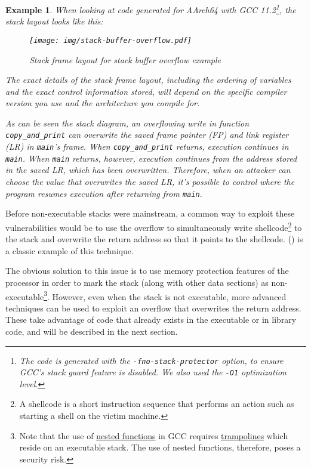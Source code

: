 \documentclass[
  a4paper,
]{report}
\newtheorem{example}{Example}
\begin{document}
\begin{example}
When looking at code generated for AArch64 with GCC 11.2\footnote{The
  code is generated with the \texttt{-fno-stack-protector} option, to
  ensure GCC's stack guard feature is disabled. We also used the
  \texttt{-O1} optimization level.}, the stack layout looks like this:

\begin{figure}
\centering
\texttt{[image: img/stack-buffer-overflow.pdf]}
\caption{Stack frame layout for stack buffer overflow example}
\end{figure}

The exact details of the stack frame layout, including the ordering of
variables and the exact control information stored, will depend on the
specific compiler version you use and the architecture you compile for.

As can be seen the stack diagram, an overflowing write in function
\texttt{copy\_and\_print} can overwrite the saved frame pointer (FP) and
link register (LR) in \texttt{main}'s frame. When
\texttt{copy\_and\_print} returns, execution continues in \texttt{main}.
When \texttt{main} returns, however, execution continues from the
address stored in the saved LR, which has been overwritten. Therefore,
when an attacker can choose the value that overwrites the saved LR, it's
possible to control where the program resumes execution after returning
from \texttt{main}.

\end{example}

Before non-executable stacks were mainstream, a common way to exploit
these vulnerabilities would be to use the overflow to simultaneously
write shellcode\footnote{A shellcode is a short instruction sequence
  that performs an action such as starting a shell on the victim
  machine.} to the stack and overwrite the return
address so that it points to the shellcode.
() is a classic example of
this technique.

The obvious solution to this issue is to use memory protection features
of the processor in order to mark the stack (along with other data
sections) as non-executable\footnote{Note that the use of
  \href{https://gcc.gnu.org/onlinedocs/gcc/Nested-Functions.html}{nested
  functions} in GCC requires
  \href{https://gcc.gnu.org/onlinedocs/gccint/Trampolines.html}{trampolines}
  which reside on an executable stack. The use of nested functions,
  therefore, poses a security risk.}. However, even when the stack is
not executable, more advanced techniques can be used to exploit an
overflow that overwrites the return address. These take advantage of
code that already exists in the executable or in library code, and will
be described in the next section.
\end{document}
